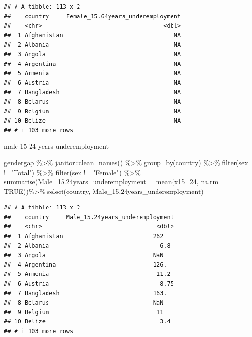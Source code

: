 \documentclass[
]{article}
\newenvironment{Shaded}{\begin{snugshade}}{\end{snugshade}}
\newcommand{\AttributeTok}[1]{\textcolor[rgb]{0.77,0.63,0.00}{#1}}
\newcommand{\ConstantTok}[1]{\textcolor[rgb]{0.00,0.00,0.00}{#1}}
\newcommand{\FloatTok}[1]{\textcolor[rgb]{0.00,0.00,0.81}{#1}}
\newcommand{\FunctionTok}[1]{\textcolor[rgb]{0.00,0.00,0.00}{#1}}
\newcommand{\NormalTok}[1]{#1}
\newcommand{\SpecialCharTok}[1]{\textcolor[rgb]{0.00,0.00,0.00}{#1}}
\newcommand{\StringTok}[1]{\textcolor[rgb]{0.31,0.60,0.02}{#1}}
\begin{document}
\begin{verbatim}
## # A tibble: 113 x 2
##    country     Female_15.64years_underemployment
##    <chr>                                   <dbl>
##  1 Afghanistan                                NA
##  2 Albania                                    NA
##  3 Angola                                     NA
##  4 Argentina                                  NA
##  5 Armenia                                    NA
##  6 Austria                                    NA
##  7 Bangladesh                                 NA
##  8 Belarus                                    NA
##  9 Belgium                                    NA
## 10 Belize                                     NA
## # i 103 more rows
\end{verbatim}

male 15-24 years underemployment

\begin{Shaded}
\begin{Highlighting}[]
\NormalTok{gendergap }\SpecialCharTok{\%\textgreater{}\%}
\NormalTok{  janitor}\SpecialCharTok{::}\FunctionTok{clean\_names}\NormalTok{() }\SpecialCharTok{\%\textgreater{}\%}
  \FunctionTok{group\_by}\NormalTok{(country) }\SpecialCharTok{\%\textgreater{}\%}
  \FunctionTok{filter}\NormalTok{(sex }\SpecialCharTok{!=}\StringTok{"Total"}\NormalTok{) }\SpecialCharTok{\%\textgreater{}\%}
  \FunctionTok{filter}\NormalTok{(sex }\SpecialCharTok{!=} \StringTok{"Female"}\NormalTok{) }\SpecialCharTok{\%\textgreater{}\%}
  \FunctionTok{summarise}\NormalTok{(}\AttributeTok{Male\_15.24years\_underemployment =} \FunctionTok{mean}\NormalTok{(x15\_24, }\AttributeTok{na.rm =} \ConstantTok{TRUE}\NormalTok{))}\SpecialCharTok{\%\textgreater{}\%}
  \FunctionTok{select}\NormalTok{(country, Male\_15}\FloatTok{.24}\NormalTok{years\_underemployment)}
\end{Highlighting}
\end{Shaded}

\begin{verbatim}
## # A tibble: 113 x 2
##    country     Male_15.24years_underemployment
##    <chr>                                 <dbl>
##  1 Afghanistan                          262   
##  2 Albania                                6.8 
##  3 Angola                               NaN   
##  4 Argentina                            126.  
##  5 Armenia                               11.2 
##  6 Austria                                8.75
##  7 Bangladesh                           163.  
##  8 Belarus                              NaN   
##  9 Belgium                               11   
## 10 Belize                                 3.4 
## # i 103 more rows
\end{verbatim}
\end{document}

